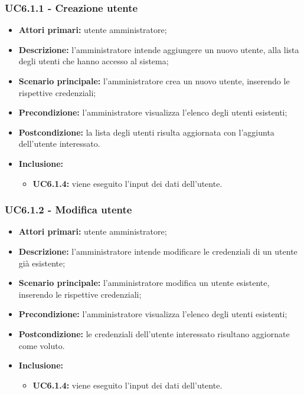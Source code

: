 \subsubsection{UC6.1.1 - Creazione utente}
	\begin{itemize}
		\item \textbf{Attori primari:} utente amministratore;
		\item \textbf{Descrizione:} l'amministratore intende aggiungere un nuovo utente, alla lista degli utenti che hanno accesso al sistema;
		\item \textbf{Scenario principale:} l'amministratore crea un nuovo utente, inserendo le rispettive credenziali;
		\item \textbf{Precondizione:} l'amministratore visualizza l'elenco degli utenti esistenti;
		\item \textbf{Postcondizione:} la lista degli utenti risulta aggiornata con l'aggiunta dell'utente interessato.
		\item \textbf{Inclusione:} 
		\begin{itemize}
			\item \textbf{UC6.1.4:} viene eseguito l'input dei dati dell'utente.
		\end{itemize}
	\end{itemize}

\subsubsection{UC6.1.2 - Modifica utente}
	\begin{itemize}
		\item \textbf{Attori primari:} utente amministratore;
		\item \textbf{Descrizione:} l'amministratore intende modificare le credenziali di un utente già esistente;
		\item \textbf{Scenario principale:} l'amministratore modifica un utente esistente, inserendo le rispettive credenziali;
		\item \textbf{Precondizione:} l'amministratore visualizza l'elenco degli utenti esistenti;
		\item \textbf{Postcondizione:} le credenziali dell'utente interessato risultano aggiornate come voluto.
		\item \textbf{Inclusione:} 
		\begin{itemize}
			\item \textbf{UC6.1.4:} viene eseguito l'input dei dati dell'utente.
		\end{itemize}
	\end{itemize}

